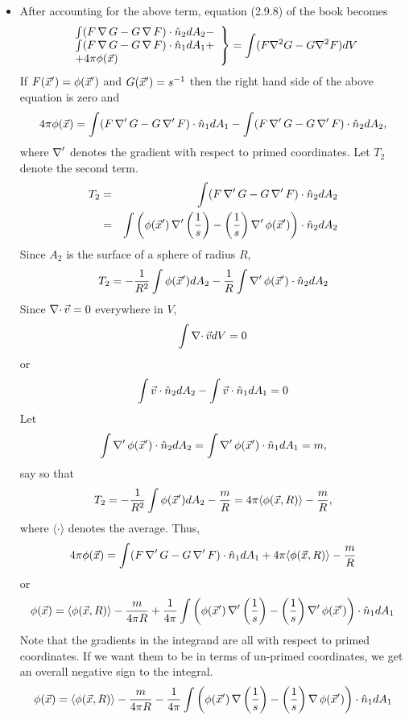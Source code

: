 \begin{itemize}
\item After accounting for the above term, equation (2.9.8) of the book becomes
\[
\left.
\begin{array}{l}
\int(F\operatorname{\nabla}{G} - G\operatorname{\nabla}{F})\cdot\hat{n}_2dA_2 - \\
\int(F\operatorname{\nabla}{G} - G\operatorname{\nabla}{F})\cdot\hat{n}_1dA_1 + \\
+ 4\pi\phi(\vec{x}) 
\end{array}
\right\} = \int(F\nabla^2G - G\nabla^2F)dV
\]
If $F(\vec{x}^\prime) = \phi(\vec{x}^\prime)$ and $G(\vec{x}^\prime) = s^{-1}$ then the right hand side of the above equation is zero and
\[
4\pi\phi(\vec{x}) = \int(F\operatorname{\nabla}^\prime{G} - G\operatorname{\nabla}^\prime{F})\cdot\hat{n}_1dA_1 - \int(F\operatorname{\nabla}^\prime{G} - G\operatorname{\nabla}^\prime{F})\cdot\hat{n}_2dA_2,
\]
where $\operatorname{\nabla}^\prime$ denotes the gradient with respect to primed coordinates. Let $T_2$ denote the second term.
\begin{eqnarray*}
T_2 &=& \int(F\operatorname{\nabla}^\prime{G} - G\operatorname{\nabla}^\prime{F})\cdot\hat{n}_2dA_2 \\
 &=& \int\left(\phi(\vec{x}^\prime)\operatorname{\nabla}^\prime{\left(\frac{1}{s}\right)} - \left(\frac{1}{s}\right)\operatorname{\nabla}^\prime{\phi(\vec{x}^\prime)}\right)\cdot\hat{n}_2 dA_2 \\
\end{eqnarray*}
Since $A_2$ is the surface of a sphere of radius $R$,
\[
T_2 = -\frac{1}{R^2}\int \phi(\vec{x}^\prime) dA_2 - \frac{1}{R}\int\operatorname{\nabla}^\prime{\phi(\vec{x}^\prime)}\cdot\hat{n}_2 dA_2
\]
Since $\operatorname{\nabla\cdot}{\vec{v}} = 0$ everywhere in $V$,
\[
\int\operatorname{\nabla\cdot}{\vec{v}}dV = 0
\]
or
\[
\int\vec{v}\cdot\hat{n}_2 dA_2 - \int\vec{v}\cdot\hat{n}_1 dA_1 = 0
\]
Let
\[
\int\operatorname{\nabla}^\prime{\phi}(\vec{x}^\prime)\cdot\hat{n}_2 dA_2 = \int\operatorname{\nabla}^\prime{\phi}(\vec{x}^\prime)\cdot\hat{n}_1 dA_1 = m,
\]
say so that
\[
T_2 = -\frac{1}{R^2}\int \phi(\vec{x}^\prime) dA_2 - \frac{m}{R} = 4\pi\langle\phi(\vec{x}, R)\rangle - \frac{m}{R},
\]
where $\langle\cdot\rangle$ denotes the average. Thus,
\[
4\pi\phi(\vec{x}) = \int(F\operatorname{\nabla}^\prime{G} - G\operatorname{\nabla}^\prime{F})\cdot\hat{n}_1dA_1 + 4\pi\langle\phi(\vec{x}, R)\rangle - \frac{m}{R}
\]
or
\[
\phi(\vec{x}) = \langle\phi(\vec{x}, R)\rangle - \frac{m}{4\pi R} + \frac{1}{4\pi}\int\left(\phi(\vec{x}^\prime)\operatorname{\nabla}^\prime{\left(\frac{1}{s}\right)} - 
\left(\frac{1}{s}\right)\operatorname{\nabla}^\prime{\phi(\vec{x}^\prime)}\right)\cdot\hat{n}_1dA_1
\]
Note that the gradients in the integrand are all with respect to primed coordinates. If we want them to be in terms of un-primed coordinates, we get an overall negative sign to the 
integral.
\begin{equation}\label{c2s9e8}
\phi(\vec{x}) = \langle\phi(\vec{x}, R)\rangle - \frac{m}{4\pi R} - \frac{1}{4\pi}\int\left(\phi(\vec{x}^\prime)\operatorname{\nabla}{\left(\frac{1}{s}\right)} - 
\left(\frac{1}{s}\right)\operatorname{\nabla}{\phi(\vec{x}^\prime)}\right)\cdot\hat{n}_1dA_1
\end{equation}


\end{itemize}

